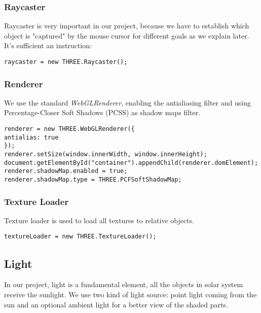 \documentclass{article}
\begin{document}
\subsubsection{Raycaster}
Raycaster is very important in our project, because we have to establish which object is "captured" by the mouse cursor for different goals as we explain later\cite{documentation:threejs}. It's sufficient an instruction:
\begin{lstlisting}
raycaster = new THREE.Raycaster();
\end{lstlisting}

\subsubsection{Renderer}
We use the standard \textit{WebGLRenderer}\cite{documentation:threejs}, enabling the antialiasing filter and using Percentage-Closer Soft Shadows (PCSS) as shadow maps filter\cite{PCSS:nvidia}.
\begin{lstlisting}
renderer = new THREE.WebGLRenderer({
antialias: true
});
renderer.setSize(window.innerWidth, window.innerHeight);
document.getElementById("container").appendChild(renderer.domElement);
renderer.shadowMap.enabled = true;
renderer.shadowMap.type = THREE.PCFSoftShadowMap;
\end{lstlisting}

\subsubsection{Texture Loader}
Texture loader\cite{documentation:threejs} is used to load all textures to relative objects.
\begin{lstlisting}
textureLoader = new THREE.TextureLoader();
\end{lstlisting}


\subsection{Light}
In our project, light is a fundamental element, all the objects in solar system receive the sunlight. We use two kind of light source: point light coming from the sun and an optional ambient light for a better view of the shaded parts.
\end{document}
